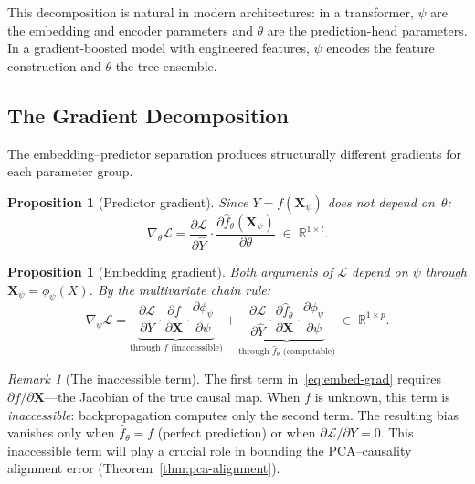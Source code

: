 \documentclass[11pt,a4paper]{article}
\theoremstyle{plain}
\newtheorem{proposition}[theorem]{Proposition}
\theoremstyle{definition}
\theoremstyle{remark}
\newtheorem{remark}[theorem]{Remark}
\newcommand{\R}{\mathbb{R}}
\newcommand{\cL}{\mathcal{L}}
\begin{document}
This decomposition is natural in modern architectures: in a transformer, $\psi$
are the embedding and encoder parameters and $\theta$ are the prediction-head
parameters.  In a gradient-boosted model with engineered features, $\psi$ encodes
the feature construction and $\theta$ the tree ensemble.

\subsection{The Gradient Decomposition}\label{sec:grad-decomp}

The embedding--predictor separation produces structurally different gradients for
each parameter group.

\begin{proposition}[Predictor gradient]\label{prop:pred-grad}
Since $Y = f(\mathbf{X}_\psi)$ does not depend on~$\theta$:
\begin{equation}\label{eq:pred-grad}
  \nabla_\theta \cL
  = \frac{\partial \cL}{\partial \hat{Y}}
    \cdot \frac{\partial \hat{f}_\theta(\mathbf{X}_\psi)}{\partial \theta}
  \;\in\; \R^{1\times l}.
\end{equation}
\end{proposition}

\begin{proposition}[Embedding gradient]\label{prop:embed-grad}
Both arguments of $\cL$ depend on $\psi$ through
$\mathbf{X}_\psi = \phi_\psi(X)$.  By the multivariate chain rule:
\begin{equation}\label{eq:embed-grad}
  \nabla_\psi \cL
  = \underbrace{
      \frac{\partial \cL}{\partial Y}
      \cdot \frac{\partial f}{\partial \mathbf{X}}
      \cdot \frac{\partial \phi_\psi}{\partial \psi}
    }_{\text{through } f \text{ (inaccessible)}}
  + \underbrace{
      \frac{\partial \cL}{\partial \hat{Y}}
      \cdot \frac{\partial \hat{f}_\theta}{\partial \mathbf{X}}
      \cdot \frac{\partial \phi_\psi}{\partial \psi}
    }_{\text{through } \hat{f}_\theta \text{ (computable)}}
  \;\in\; \R^{1\times p}.
\end{equation}
\end{proposition}

\begin{remark}[The inaccessible term]\label{rmk:inaccessible}
The first term in~\eqref{eq:embed-grad} requires
$\partial f/\partial \mathbf{X}$---the Jacobian of the true causal map.  When $f$
is unknown, this term is \emph{inaccessible}: backpropagation computes only the
second term.  The resulting bias vanishes only when
$\hat{f}_\theta = f$ (perfect prediction) or when
$\partial \cL / \partial Y = 0$.  This inaccessible term will play a crucial role
in bounding the PCA--causality alignment error
(Theorem~\ref{thm:pca-alignment}).
\end{remark}
\end{document}
